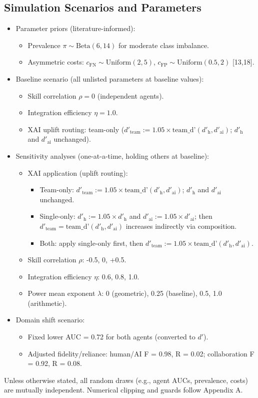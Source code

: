 \documentclass[11pt,a4paper]{article}
\begin{document}
\subsection{Simulation Scenarios and Parameters}
\begin{itemize}
\item Parameter priors (literature-informed):
  \begin{itemize}
  \item Prevalence $\pi \sim \text{Beta}(6, 14)$ for moderate class imbalance.
  \item Asymmetric costs: $c_{\text{FN}} \sim \text{Uniform}(2, 5)$, $c_{\text{FP}} \sim \text{Uniform}(0.5, 2)$ [13,18].
  \end{itemize}
\item Baseline scenario (all unlisted parameters at baseline values):
  \begin{itemize}
  \item Skill correlation $\rho = 0$ (independent agents).
  \item Integration efficiency $\eta = 1.0$.
  \item XAI uplift routing: team-only ($d'_{\text{team}} := 1.05 \times \text{team\_d'}(d'_{\text{h}}, d'_{\text{ai}})$; $d'_{\text{h}}$ and $d'_{\text{ai}}$ unchanged).
  \end{itemize}
\item Sensitivity analyses (one-at-a-time, holding others at baseline):
  \begin{itemize}
  \item XAI application (uplift routing):
    \begin{itemize}
    \item Team-only: $d'_{\text{team}} := 1.05 \times \text{team\_d'}(d'_{\text{h}}, d'_{\text{ai}})$; $d'_{\text{h}}$ and $d'_{\text{ai}}$ unchanged.
    \item Single-only: $d'_{\text{h}} := 1.05 \times d'_{\text{h}}$ and $d'_{\text{ai}} := 1.05 \times d'_{\text{ai}}$; then $d'_{\text{team}} = \text{team\_d'}(d'_{\text{h}}, d'_{\text{ai}})$ increases indirectly via composition.
    \item Both: apply single-only first, then $d'_{\text{team}} := 1.05 \times \text{team\_d'}(d'_{\text{h}}, d'_{\text{ai}})$.
    \end{itemize}
  \item Skill correlation $\rho$: -0.5, 0, +0.5.
  \item Integration efficiency $\eta$: 0.6, 0.8, 1.0.
  \item Power mean exponent $\lambda$: 0 (geometric), 0.25 (baseline), 0.5, 1.0 (arithmetic).
  \end{itemize}
\item Domain shift scenario:
  \begin{itemize}
  \item Fixed lower AUC = 0.72 for both agents (converted to $d'$).
  \item Adjusted fidelity/reliance: human/AI F = 0.98, R = 0.02; collaboration F = 0.92, R = 0.08.
  \end{itemize}
\end{itemize}
Unless otherwise stated, all random draws (e.g., agent AUCs, prevalence, costs) are mutually independent. Numerical clipping and guards follow Appendix A.
\end{document}
